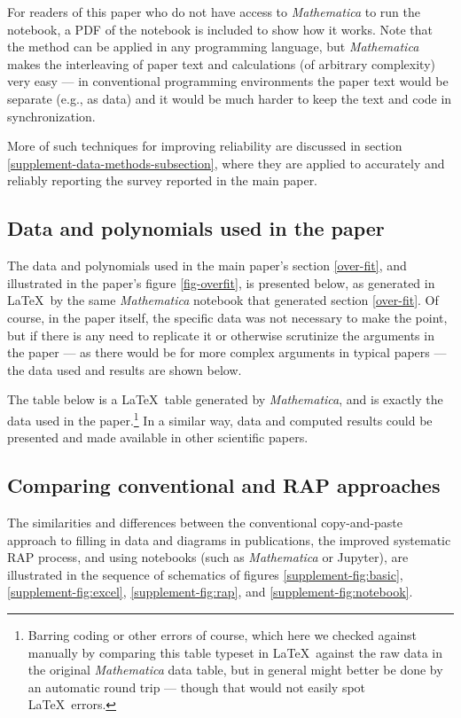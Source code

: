 \documentclass[10pt,a4paper]{article}
\begin{document}
For readers of this paper who do not have access to \emph{Mathematica\/} to run the notebook, a PDF of the notebook is included to show how it works. Note that the method can be applied in any programming language, but \emph{Mathematica\/} makes the interleaving of paper text and calculations (of arbitrary complexity) very easy --- in conventional programming environments the paper text would be separate (e.g., as data) and it would be much harder to keep the text and code in synchronization.

More of such techniques for improving reliability are discussed in section \ref{supplement-data-methods-subsection}, where they are applied to accurately and reliably reporting the survey reported in the main paper.

\subsection{Data and polynomials used in the paper}
The data and polynomials used in the main paper's section \ref{over-fit}, and illustrated in the paper's figure \ref{fig-overfit}, is presented below, as generated in \LaTeX\ by the same \emph{Mathematica\/} notebook that generated section \ref{over-fit}. Of course, in the paper itself, the specific data was not necessary to make the point, but if there is any need to replicate it or otherwise scrutinize the arguments in the paper --- as there would be for more complex arguments in typical papers --- the data used and results are shown below. 

The table below is a \LaTeX\ table generated by \emph{Mathematica}, and is exactly the data used in the paper.\footnote{Barring coding or other errors of course, which here we checked against manually by comparing this table typeset in \LaTeX\ against the raw data in the original \emph{Mathematica\/} data table, but in general might better be done by an automatic round trip --- though that would not easily spot \LaTeX\ errors.} In a similar way, data and computed results could be presented and made available in other scientific papers.



\subsection{Comparing conventional and RAP approaches}
\label{supplement-RAP-diagrams}
The similarities and differences between the conventional copy-and-paste approach to filling in data and diagrams in publications, the improved systematic RAP process, and using notebooks (such as \emph{Mathematica\/} or Jupyter), are illustrated in the sequence of schematics of figures \ref{supplement-fig:basic}, \ref{supplement-fig:excel}, \ref{supplement-fig:rap}, and \ref{supplement-fig:notebook}.
\end{document}
